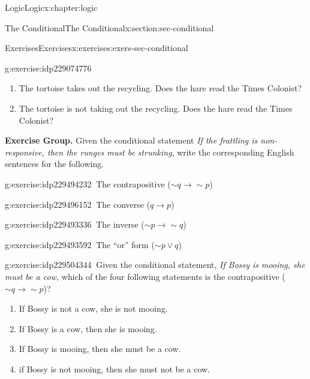\documentclass[twoside,10pt,]{book}
\numberwithin{equation}{section}
\newcommand{\inverse}{{\sim\!{p}{} {\rightarrow} \sim\!{q}{}}}
\newcommand{\converse}{{q {\rightarrow} p}}
\newcommand{\contrapositive}{{\sim\!{q}{} {\rightarrow} \sim\!{p}{}}}
\begin{document}
\begin{chapterptx}{Logic}{}{Logic}{}{}{x:chapter:logic}
\begin{sectionptx}{The Conditional}{}{The Conditional}{}{}{x:section:sec-conditional}
\begin{exercises-subsection}{Exercises}{}{Exercises}{}{}{x:exercises:exers-sec-conditional}
\begin{exercisegroup}
\begin{divisionexerciseeg}{22}{}{}{g:exercise:idp229074776}
\begin{enumerate}[label=(\alph*)]
\item{}The tortoise takes out the recycling.  Does the hare read the Times Colonist?%
\item{}The tortoise is not taking out the recycling.  Does the hare read the Times Colonist?%
\end{enumerate}
\end{divisionexerciseeg}%
\end{exercisegroup}
\par\medskip\noindent
\par\medskip\noindent%
\textbf{Exercise Group.}\space\space%
Given the conditional statement \emph{If the frattling is non-responsive, then the runges must be strunking}, write the corresponding English sentences for the following.\begin{exercisegroup}
\begin{divisionexerciseeg}{23}{}{}{g:exercise:idp229494232}%
\(\ \)The contrapositive (\(\contrapositive\))\end{divisionexerciseeg}%
\begin{divisionexerciseeg}{24}{}{}{g:exercise:idp229496152}%
\(\ \)The converse (\(\converse\))\end{divisionexerciseeg}%
\begin{divisionexerciseeg}{25}{}{}{g:exercise:idp229493336}%
\(\ \)The inverse (\(\inverse\))\end{divisionexerciseeg}%
\begin{divisionexerciseeg}{26}{}{}{g:exercise:idp229493592}%
\(\ \)The ``or'' form (\(\sim\!{p}{\vee} q\))\end{divisionexerciseeg}%
\end{exercisegroup}
\par\medskip\noindent
\begin{divisionexercise}{27}{}{}{g:exercise:idp229504344}%
\(\ \)Given the conditional statement, \emph{If Bossy is mooing, she must be a cow,} which of the four following statements is the contrapositive (\(\contrapositive\))? %
\begin{enumerate}[label=(\alph*)]
\item{}If Bossy is not a cow, she is not mooing.%
\item{}If Bossy is a cow, then she is mooing.%
\item{}If Bossy is mooing, then she must be a cow.%
\item{}if Bossy is not mooing, then she must not be a cow.%
\end{enumerate}
\end{divisionexercise}%

\end{exercises-subsection}
\end{sectionptx}
\end{chapterptx}
\end{document}
